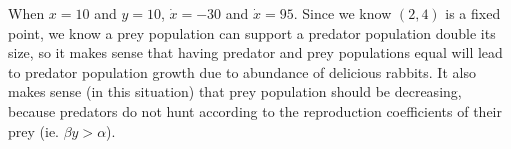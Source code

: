 \documentclass[10pt]{article}
\begin{document}
\begin{enumerate}
\begin{enumerate}
              When $x = 10$ and $y = 10$, $\dot x = -30$ and $\dot x = 95$.
              Since we know $(2,4)$ is a fixed point, we know a prey population
              can support a predator population double its size, so it makes
              sense that having predator and prey populations equal will lead
              to predator population growth due to abundance of delicious
              rabbits. It also makes sense (in this situation) that prey
              population should be decreasing, because predators do not hunt
              according to the reproduction coefficients of their prey (ie.
              $\beta y > \alpha$).


        \end{enumerate}
  \end{enumerate}
\end{document}

